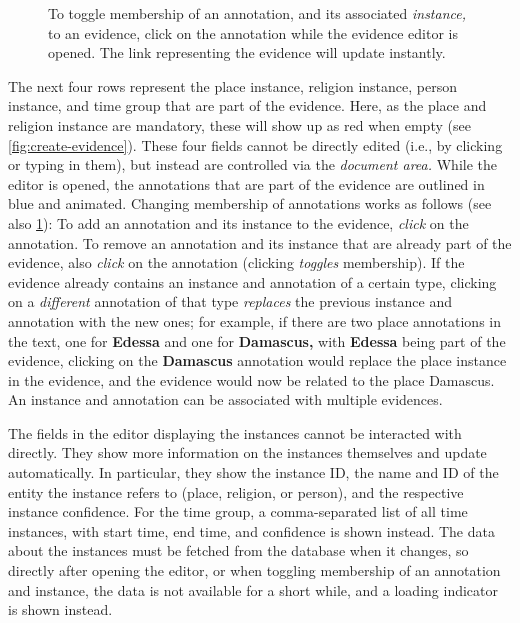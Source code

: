 \begin{figure}[htb]

  \caption{
    To toggle membership of an annotation, and its associated \emph{instance,} to an evidence, click on the annotation while the evidence editor is opened.
    The link representing the evidence will update instantly.
  }
  \label{fig:edit-evidence-membership}
\end{figure}

The next four rows represent the place instance, religion instance, person instance, and time group that are part of the evidence.
Here, as the place and religion instance are mandatory, these will show up as red when empty (see \cref{fig:create-evidence}).
These four fields cannot be directly edited (i.e., by clicking or typing in them), but instead are controlled via the \emph{document area.}
While the editor is opened, the annotations that are part of the evidence are outlined in blue and animated.
Changing membership of annotations works as follows (see also \cref{fig:edit-evidence-membership}):
To add an annotation and its instance to the evidence, \emph{click} on the annotation.
To remove an annotation and its instance that are already part of the evidence, also \emph{click} on the annotation (clicking \emph{toggles} membership).
If the evidence already contains an instance and annotation of a certain type, clicking on a \emph{different} annotation of that type \emph{replaces} the previous instance and annotation with the new ones;
for example, if there are two place annotations in the text, one for \textbf{Edessa} and one for \textbf{Damascus,} with \textbf{Edessa} being part of the evidence, clicking on the \textbf{Damascus} annotation would replace the place instance in the evidence, and the evidence would now be related to the place Damascus.
An instance and annotation can be associated with multiple evidences.

The fields in the editor displaying the instances cannot be interacted with directly.
They show more information on the instances themselves and update automatically.
In particular, they show the instance ID, the name and ID of the entity the instance refers to (place, religion, or person), and the respective instance confidence.
For the time group, a comma-separated list of all time instances, with start time, end time, and confidence is shown instead.
The data about the instances must be fetched from the database when it changes, so directly after opening the editor, or when toggling membership of an annotation and instance, the data is not available for a short while, and a loading indicator is shown instead.

